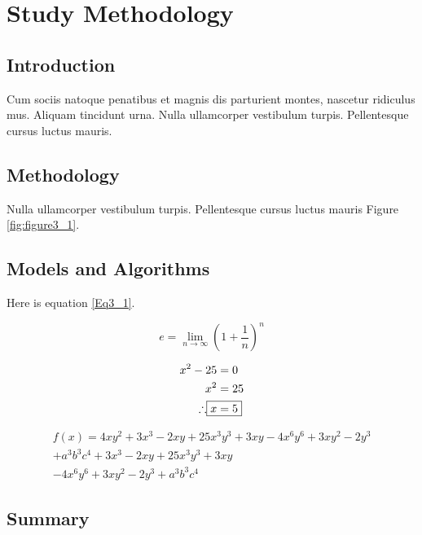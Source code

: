 
\chapter{Study Methodology}\doublespacing %

\label{Chapter3} %


\section{Introduction}

Cum sociis natoque penatibus et magnis dis parturient montes, nascetur ridiculus mus. Aliquam tincidunt urna. Nulla ullamcorper
vestibulum turpis. Pellentesque cursus luctus mauris.


\section{Methodology}
\lipsum[2] 

Nulla ullamcorper
vestibulum turpis. Pellentesque cursus luctus mauris Figure \ref{fig:figure3_1}.
 



\section{Models and Algorithms}
\lipsum[1]

Here is equation \ref{Eq3_1}.

\begin{equation}
e = \lim_{n\to\infty} \left(1+\frac{1}{n}\right)^n
\label{Eq3_1}
\end{equation} 

\begin{align}
	x^2 -25 &= 0 \nonumber \\
	x^2 &= 25 \nonumber \\
	\therefore \Aboxed{x &= 5}
 \label{Eq3_2}
\end{align}



\begin{multline}
	f(x) = 4xy^2 + 3x^3 - 2xy + 25x^3y^3 + 3xy - 4x^6y^6 + 3xy^2 - 2y^3\\ + a^3b^3c^4 + 3x^3 - 2xy + 25x^3y^3 + 3xy\\ - 4x^6y^6 + 3xy^2 - 2y^3 + a^3b^3c^4
\label{Eq3_3}
\end{multline}

\section{Summary}
\lipsum[2]
